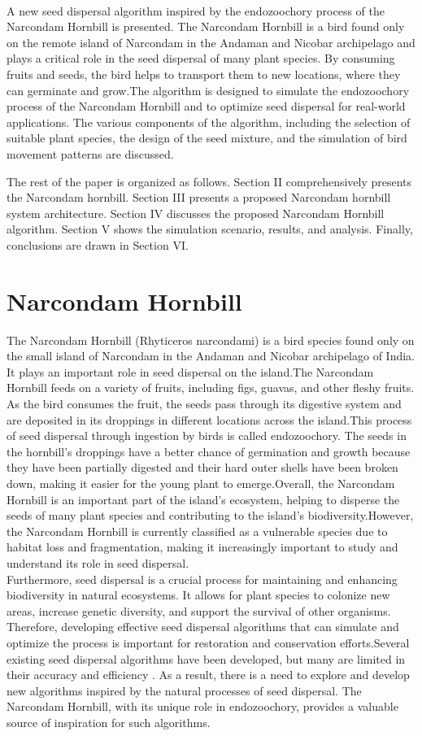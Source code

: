 \documentclass[conference]{IEEEtran}
\begin{document}
\\A new seed dispersal algorithm inspired by the endozoochory process of the Narcondam Hornbill\cite{4} is presented. The Narcondam Hornbill is a bird found only on the remote island of Narcondam in the Andaman and Nicobar archipelago and plays a critical role in the seed dispersal of many plant species. By consuming fruits and seeds, the bird helps to transport them to new locations, where they can germinate and grow.The algorithm is designed to simulate the endozoochory process of the Narcondam Hornbill and to optimize seed dispersal for real-world applications. The various components of the algorithm, including the selection of suitable plant species, the design of the seed mixture, and the simulation of bird movement patterns are discussed.

The rest of the paper is organized as follows. Section II comprehensively presents the Narcondam hornbill. Section III presents a proposed Narcondam hornbill system architecture. Section IV discusses the proposed Narcondam Hornbill algorithm. Section V shows the simulation scenario, results, and analysis. Finally, conclusions are drawn in Section VI.
\section{Narcondam Hornbill}
The Narcondam Hornbill (Rhyticeros narcondami) is a bird species found only on the small island of Narcondam\cite{5} in the Andaman and Nicobar archipelago of India. It plays an important role in seed dispersal on the island.The Narcondam Hornbill feeds on a variety of fruits, including figs, guavas, and other fleshy fruits. As the bird consumes the fruit, the seeds pass through its digestive system and are deposited in its droppings in different locations across the island.This process of seed dispersal through ingestion by birds is called endozoochory. The seeds in the hornbill's droppings have a better chance of germination and growth because they have been partially digested and their hard outer shells have been broken down, making it easier for the young plant to emerge.Overall, the Narcondam Hornbill is an important part of the island's ecosystem, helping to disperse the seeds of many plant species and contributing to the island's biodiversity.However, the Narcondam Hornbill is currently classified as a vulnerable species due to habitat loss and fragmentation, making it increasingly important to study and understand its role in seed dispersal.
\\Furthermore, seed dispersal is a crucial process for maintaining and enhancing biodiversity in natural ecosystems. It allows for plant species to colonize new areas, increase genetic diversity, and support the survival of other organisms. Therefore, developing effective seed dispersal algorithms that can simulate and optimize the process is important for restoration and conservation efforts.Several existing seed dispersal algorithms have been developed, but many are limited in their accuracy and efficiency \cite{6}. As a result, there is a need to explore and develop new algorithms inspired by the natural processes of seed dispersal. The Narcondam Hornbill, with its unique role in endozoochory, provides a valuable source of inspiration for such algorithms.
\end{document}
